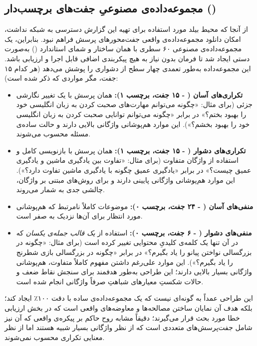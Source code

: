 \documentclass[11pt,a4paper]{article}
\begin{document}
	\subsection{مجموعه‌داده‌ی مصنوعیِ جفت‌های برچسب‌دار ()}
	
	از آنجا که محیط بیلد مورد استفاده برای تهیه این گزارش دسترسی به شبکه نداشت، امکان دانلود مجموعه‌داده‌ی واقعی جفت‌محورهای پرسش  فراهم نبود. بنابراین، یک مجموعه‌داده‌ی مصنوعی ۶۰ سطری با همان ساختار و شمای استاندارد () به‌صورت دستی ایجاد شد تا فرمان  بدون نیاز به هیچ پیکربندی اضافی قابل اجرا و ارزیابی باشد. این مجموعه‌داده به‌طور تعمدی چهار سطح از دشواری را پوشش می‌دهد (هر کدام ۱۵ جفت، مگر مواردی که ذکر شده است):
	
	\begin{itemize}
		\item \textbf{تکراری‌های آسان ( - ۱۵ جفت، برچسب ۱):} همان پرسش با یک تغییر نگارشی جزئی (برای مثال: «چگونه می‌توانم مهارت‌های صحبت کردن به زبان انگلیسی خود را بهبود بختم؟» در برابر «چگونه می‌توانم توانایی صحبت کردن به زبان انگلیسی خود را بهبود بخشم؟»). این موارد هم‌پوشانی واژگانی بالایی دارند و حالت ساده‌ی مسئله محسوب می‌شوند.
		
		\item \textbf{تکراری‌های دشوار ( - ۱۵ جفت، برچسب ۱):} همان پرسش با بازنویسی کامل و استفاده از واژگان متفاوت (برای مثال: «تفاوت بین یادگیری ماشین و یادگیری عمیق چیست؟» در برابر «یادگیری عمیق چگونه با یادگیری ماشین تفاوت دارد؟»). این موارد هم‌پوشانی واژگانی پایینی دارند و برای روش‌های مبتنی بر واژگان، چالشی جدی به شمار می‌روند.
		
		\item \textbf{منفی‌های آسان ( - ۲۴ جفت، برچسب ۰):} موضوعات کاملاً نامرتبط که هم‌پوشانی مورد انتظار برای آن‌ها نزدیک به صفر است.
		
		\item \textbf{منفی‌های دشوار ( - ۶ جفت، برچسب ۰):} استفاده از \emph{یک قالب جمله‌ی یکسان} که در آن تنها یک کلمه‌ی کلیدیِ محتوایی تغییر کرده است (برای مثال: «چگونه در بزرگسالی نواختن پیانو را یاد بگیرم؟» در برابر «چگونه در بزرگسالی بازی شطرنج را یاد بگیرم؟»). این موارد علی‌رغم داشتن مفهوم کاملاً متفاوت، هم‌پوشانی واژگانی بسیار بالایی دارند؛ این طراحی به‌طور هدفمند برای سنجش نقاط ضعف و حالات شکستِ معیارهای شباهتِ صرفاً واژگانی انجام شده است.
	\end{itemize}
	
	این طراحی عمداً به گونه‌ای نیست که یک مجموعه‌داده‌ی ساده با دقت ۱۰۰٪ ایجاد کند؛ بلکه هدف آن نمایان ساختن مصالحه‌ها و معاوضه‌های واقعی است که در بخش ارزیابی خطا مورد بحث قرار می‌گیرند؛ دقیقاً مشابه روح حاکم بر پیکره‌ی واقعی  که آن نیز شامل جفت‌پرسش‌های متعددی است که از نظر واژگانی بسیار شبیه هستند اما از نظر معنایی تکراری محسوب نمی‌شوند.
	
\end{document}
